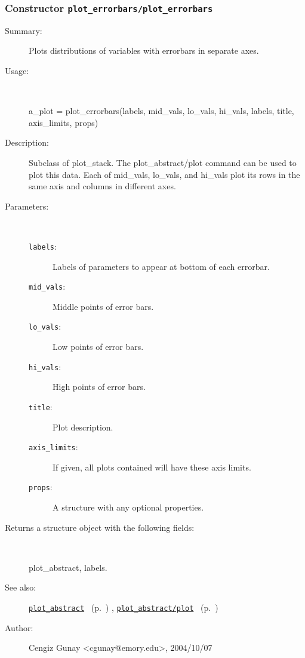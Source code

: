 \subsubsection[Constructor \texttt{plot\_errorbars}]{Constructor \texttt{plot\_errorbars/plot\_errorbars}}%
%
\label{ref_plot_errorbars__plot_errorbars}%
\hypertarget{ref_plot_errorbars__plot_errorbars}{}%
\begin{description}
\item[Summary:]Plots distributions of variables with errorbars in separate axes.
%
\item[Usage:]~%
\begin{lyxcode}%
a\_plot = plot\_errorbars(labels, mid\_vals, lo\_vals, hi\_vals, labels, 
			 title, axis\_limits, props)
%
\end{lyxcode}%
%
\item[Description:]%
Subclass of plot\_stack. The plot\_abstract/plot command can be used to
 plot this data. Each of mid\_vals, lo\_vals, and hi\_vals plot its rows in
 the same axis and columns in different axes.
\item[Parameters:]~
\begin{description}%
\item[\texttt{labels}:]
 Labels of parameters to appear at bottom of each errorbar.
\item[\texttt{mid\_vals}:]
 Middle points of error bars.
\item[\texttt{lo\_vals}:]
 Low points of error bars.
\item[\texttt{hi\_vals}:]
 High points of error bars.
\item[\texttt{title}:]
 Plot description.
\item[\texttt{axis\_limits}:]
 If given, all plots contained will have these axis limits.
\item[\texttt{props}:]
 A structure with any optional properties.
\end{description}%
%
\item[Returns a structure object with the following fields:
]~

	plot\_abstract, labels.
%
%
\item[See also:]%
\hyperlink{ref_plot_abstract}{\texttt{plot\_abstract}}%
\ (p.~\pageref{ref_plot_abstract})%
%
, \hyperlink{ref_plot_abstract__plot}{\texttt{plot\_abstract/plot}}%
\ (p.~\pageref{ref_plot_abstract__plot})%
%
%
\item[Author:]%
Cengiz Gunay <cgunay@emory.edu>, 2004/10/07
%
\end{description}
\methodline%
